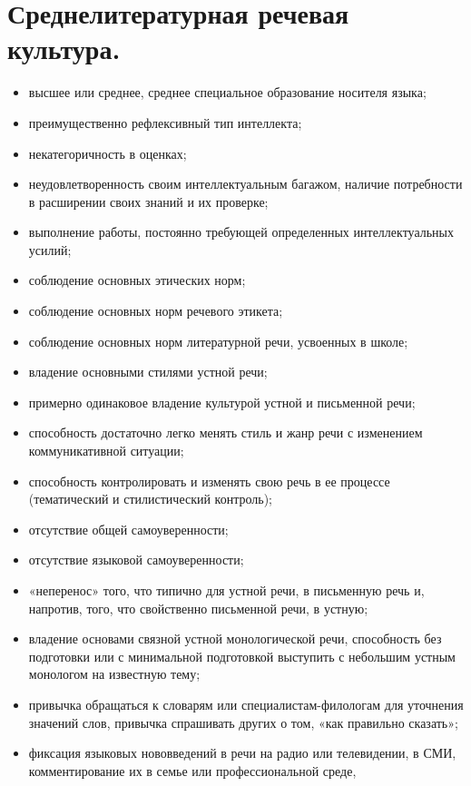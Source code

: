 \section{Среднелитературная речевая культура.}

\begin{itemize}
    \item высшее или среднее, среднее специальное образование носителя языка;
    \item преимущественно рефлексивный тип интеллекта;
    \item некатегоричность в оценках;
    \item неудовлетворенность своим интеллектуальным багажом, наличие потребности в расширении своих знаний и их проверке;
    \item выполнение работы, постоянно требующей определенных интеллектуальных усилий;
    \item соблюдение основных этических норм;
    \item соблюдение основных норм речевого этикета;
    \item соблюдение основных норм литературной речи, усвоенных в школе;
    \item владение основными стилями устной речи;
    \item примерно одинаковое владение культурой устной и письменной речи;
    \item способность достаточно легко менять стиль и жанр речи с изменением коммуникативной ситуации;
    \item способность контролировать и изменять свою речь в ее процессе (тематический и стилистический контроль);
    \item отсутствие общей самоуверенности;
    \item отсутствие языковой самоуверенности;
    \item «неперенос» того, что типично для устной речи, в письменную речь и, напротив, того, что свойственно письменной речи, в устную;
    \item владение основами связной устной монологической речи, способность без подготовки или с минимальной подготовкой выступить с небольшим устным монологом на известную тему;
    \item привычка обращаться к словарям или специалистам-филологам для уточнения значений слов, привычка спрашивать других о том, «как правильно сказать»;
    \item фиксация языковых нововведений в речи на радио или телевидении, в СМИ, комментирование их в семье или профессиональной среде,

\end{itemize}

